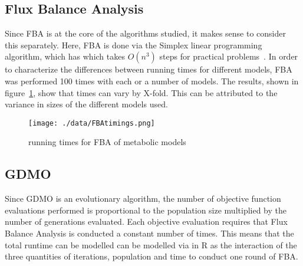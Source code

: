 \subsection{Flux Balance Analysis}
Since FBA is at the core of the algorithms studied, it makes sense to consider this separately. 
Here, FBA is done via the Simplex linear programming algorithm, which has which takes \(O(n^3)\) steps for practical problems~\cite{Dantzig1963}. 
In order to characterize the differences between running times for different models, FBA was performed 100 times with each or a number of models. The results, shown in figure~\ref{fig:FBAtimings}, show that times can vary by  X-fold. This can be attributed to the variance in sizes of the different models used.

\begin{figure}
\label{fig:FBAtimings}
\texttt{[image: ./data/FBAtimings.png]}
\caption{running times for FBA of metabolic models}
\end{figure}

\subsection{GDMO}
Since GDMO is an evolutionary algorithm, the number of objective function evaluations performed is proportional to the population size multiplied by the number of generations evaluated. 
Each objective evaluation requires that Flux Balance Analysis is conducted a constant number of times. 
This means that the total runtime can be modelled can be modelled via in R as the interaction of the three quantities of iterations, population and time to conduct one round of FBA.


